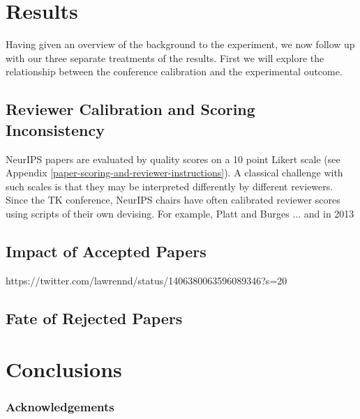 \documentclass[twoside]{article}
\begin{document}
\section{Results}

Having given an overview of the background to the experiment, we now follow up with our three separate treatments of the results. First we will explore the relationship between the conference calibration and the experimental outcome.

\hypertarget{reviewer-calibration-and-scoring-inconsistency}{%
\subsection{Reviewer Calibration and Scoring Inconsistency}\label{reviewer-calibration-and-scoring-inconsistency}}

NeurIPS papers are evaluated by quality scores on a 10 point Likert scale (see Appendix \ref{paper-scoring-and-reviewer-instructions}). A classical challenge with such scales is that they may be interpreted differently by different reviewers. Since the TK conference, NeurIPS chairs have often calibrated reviewer scores using scripts of their own devising. For example, Platt and Burges ... and in 2013 

\subsection{Impact of Accepted Papers}

https://twitter.com/lawrennd/status/1406380063596089346?s=20

\subsection{Fate of Rejected Papers}

\section{Conclusions}

\subsubsection*{Acknowledgements}




\onecolumn
{}
\appendix


\vfill
\end{document}
